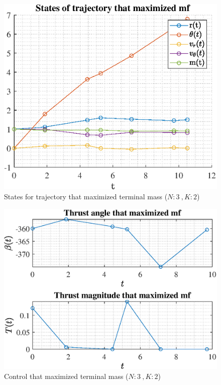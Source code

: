 \documentclass[]{article}
\begin{document}
	\begin{figure}
		\centering
		\includegraphics[scale=0.75]{states_N3_K2_C2_mf.eps}
		\caption{States for trajectory that maximized terminal mass (\(N:3\ , K:2\))}
		\label{fig:states_N3_K2_C2_mf}
	\end{figure}
	\begin{figure}
		\centering
		\includegraphics[scale=0.75]{control_N3_K2_C2_mf.eps}
		\caption{Control that maximized terminal mass (\(N:3\ , K:2\))}
		\label{fig:control_N3_K2_C2_mf}
	\end{figure}
\end{document}
